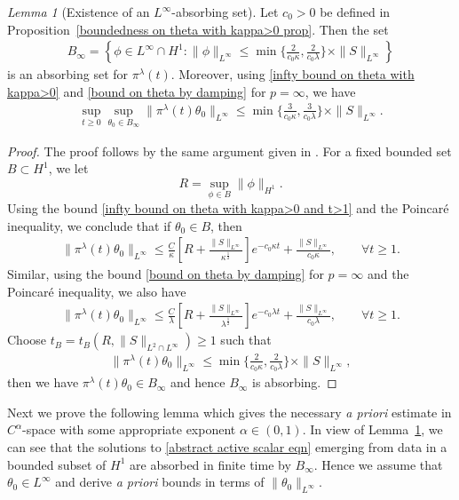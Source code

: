 \documentclass[reqno]{amsart}%
\theoremstyle{definition}
\theoremstyle{remark}
\numberwithin{equation}{section}
\newtheorem{lemma}[theorem]{Lemma}
\newcommand{\1}{\mathbf{1}}
\newcommand{\pin}{\pi^{\lambda}}
\numberwithin{equation}{section}
\numberwithin{theorem}{section}
\numberwithin{figure}{section}
\begin{document}
\begin{lemma}[Existence of an $L^\infty$-absorbing set]\label{Existence of an L infty absorbing set lemma}
Let $c_0>0$ be defined in Proposition~\ref{boundedness on theta with kappa>0 prop}. Then the set 
\begin{align*}
B_{\infty}=\left\{\phi\in L^\infty\cap H^1:\|\phi\|_{L^\infty}\le\min\{\frac{2}{c_0\kappa},\frac{2}{c_0\lambda}\}\times\|S\|_{L^\infty}\right\}
\end{align*}
is an absorbing set for $\pin(t)$. Moreover, using \eqref{infty bound on theta with kappa>0} and \eqref{bound on theta by damping} for $p=\infty$, we have
\begin{align}\label{bound on solution map in L infty}
\sup_{t\ge0}\sup_{\theta_0\in B_{\infty}}\|\pin(t)\theta_0\|_{L^\infty}\le\min\{\frac{3}{c_0\kappa},\frac{3}{c_0\lambda}\}\times\|S\|_{L^\infty}.
\end{align}
\end{lemma}

\begin{proof}
The proof follows by the same argument given in \cite[Theorem~3.1]{CZV16}. For a fixed bounded set $B\subset H^1$, we let 
\[R=\sup_{\phi\in B}\|\phi\|_{H^1}.\]
Using the bound \eqref{infty bound on theta with kappa>0 and t>1} and the Poincar\'{e} inequality, we conclude that if $\theta_0\in B$, then
\begin{align*}
\|\pin(t)\theta_0\|_{L^\infty}\le\frac{C}{\kappa}\left[R+\frac{\|S\|_{L^\infty}}{\kappa^\frac{1}{2}}\right]e^{-c_0\kappa t}+\frac{\|S\|_{L^\infty}}{c_0\kappa},\qquad\forall t\ge1.
\end{align*}
Similar, using the bound \eqref{bound on theta by damping} for $p=\infty$ and the Poincar\'{e} inequality, we also have
\begin{align*}
\|\pin(t)\theta_0\|_{L^\infty}\le\frac{C}{\lambda}\left[R+\frac{\|S\|_{L^\infty}}{\lambda^\frac{1}{2}}\right]e^{-c_0\lambda t}+\frac{\|S\|_{L^\infty}}{c_0\lambda},\qquad\forall t\ge1.
\end{align*}
Choose $t_B=t_B(R,\|S\|_{L^2\cap L^\infty})\ge1$ such that
\begin{align*}
\|\pin(t)\theta_0\|_{L^\infty}\le\min\{\frac{2}{c_0\kappa},\frac{2}{c_0\lambda}\}\times\|S\|_{L^\infty},
\end{align*}
then we have $\pin(t)\theta_0\in B_{\infty}$ and hence $B_\infty$ is absorbing.
\end{proof}

Next we prove the following lemma which gives the necessary {\it a priori} estimate in $C^{\alpha}$-space with some appropriate exponent $\alpha\in(0,1)$. In view of Lemma~\ref{Existence of an L infty absorbing set lemma}, we can see that the solutions to \eqref{abstract active scalar eqn} emerging from data in a bounded subset of $H^1$ are absorbed in finite time by $B_{\infty}$. Hence we assume that $\theta_0\in L^\infty$ and derive {\it a priori} bounds in terms of $\|\theta_0\|_{L^\infty}$.
\end{document}
